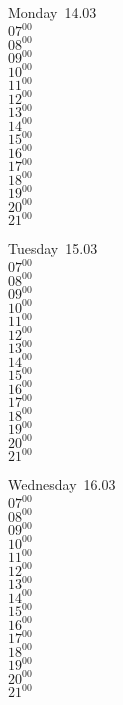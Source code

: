 \documentclass[11pt,a4paper]{book}\usepackage[]{graphicx}\usepackage[]{color}
\begin{document}
\begin{headerbox}
\end{headerbox}
\begin{weekdaybox}
  Monday~14.03\\
  { 
  \vfill
  $07^{00}$\\
$08^{00}$\\
$09^{00}$\\
$10^{00}$\\
$11^{00}$\\
$12^{00}$\\
$13^{00}$\\
$14^{00}$\\
$15^{00}$\\
$16^{00}$\\
$17^{00}$\\
$18^{00}$\\
$19^{00}$\\
$20^{00}$\\
$21^{00}$\\
  }
\end{weekdaybox}
\begin{weekdaybox}
  Tuesday~15.03\\
  { 
  \vfill
  $07^{00}$\\
$08^{00}$\\
$09^{00}$\\
$10^{00}$\\
$11^{00}$\\
$12^{00}$\\
$13^{00}$\\
$14^{00}$\\
$15^{00}$\\
$16^{00}$\\
$17^{00}$\\
$18^{00}$\\
$19^{00}$\\
$20^{00}$\\
$21^{00}$\\
  }
\end{weekdaybox}
\begin{weekdaybox}
  Wednesday~16.03\\
  { 
  \vfill
  $07^{00}$\\
$08^{00}$\\
$09^{00}$\\
$10^{00}$\\
$11^{00}$\\
$12^{00}$\\
$13^{00}$\\
$14^{00}$\\
$15^{00}$\\
$16^{00}$\\
$17^{00}$\\
$18^{00}$\\
$19^{00}$\\
$20^{00}$\\
$21^{00}$\\
  }
\end{weekdaybox}
\end{document}
